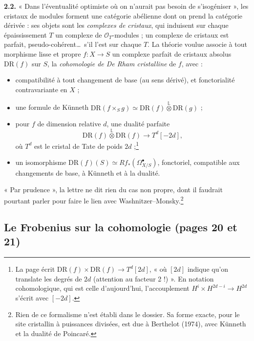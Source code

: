 \documentclass[11pt,a4paper]{article}
\begin{document}
\textbf{2.2.} « Dans l'éventualité optimiste où on n'aurait pas besoin de
s'isogéniser », les cristaux de modules forment une catégorie abélienne dont
on prend la catégorie dérivée : ses objets sont les \emph{complexes de
cristaux}, qui induisent sur chaque épaississement $T$ un complexe de
$\mathcal{O}_T$-modules ; un complexe de cristaux est parfait,
pseudo-cohérent\ldots\ s'il l'est sur chaque $T$. La théorie voulue associe à
tout morphisme lisse et propre $f : X \to S$ un complexe parfait de cristaux
absolus $\mathrm{DR}(f)$ sur $S$, la \emph{cohomologie de De Rham
cristalline} de $f$, avec :
\begin{itemize}
\item compatibilité à tout changement de base (au sens dérivé), et
fonctorialité contravariante en $X$ ;
\item une formule de Künneth
$\mathrm{DR}(f \times_S g) \simeq \mathrm{DR}(f) \overset{\mathbb{L}}{\otimes} \mathrm{DR}(g)$ ;
\item pour $f$ de dimension relative $d$, une dualité parfaite
\[
  \mathrm{DR}(f) \overset{\mathbb{L}}{\otimes} \mathrm{DR}(f) \longrightarrow T^d[-2d] ,
\]
où $T^d$ est le cristal de Tate de poids $2d$ ;\footnote{La page écrit
$\mathrm{DR}(f) \times \mathrm{DR}(f) \to T^d[2d]$, « où $[2d]$ indique qu'on
translate les degrés de $2d$ (attention au facteur 2 !) ». En notation
cohomologique, qui est celle d'aujourd'hui, l'accouplement $H^i \times H^{2d-i}
\to H^{2d}$ s'écrit avec $[-2d]$.}
\item un isomorphisme $\mathrm{DR}(f)(S) \simeq Rf_*(\Omega^\bullet_{X/S})$,
fonctoriel, compatible aux changements de base, à Künneth et à la dualité.
\end{itemize}
« Par prudence », la lettre ne dit rien du cas non propre, dont il faudrait
pourtant parler pour faire le lien avec Washnitzer--Monsky.\footnote{Rien de
ce formalisme n'est établi dans le dossier. Sa forme exacte, pour le site
cristallin à puissances divisées, est due à Berthelot (1974), avec Künneth et
la dualité de Poincaré.}

\subsection*{Le Frobenius sur la cohomologie (pages 20 et 21)}
\end{document}
